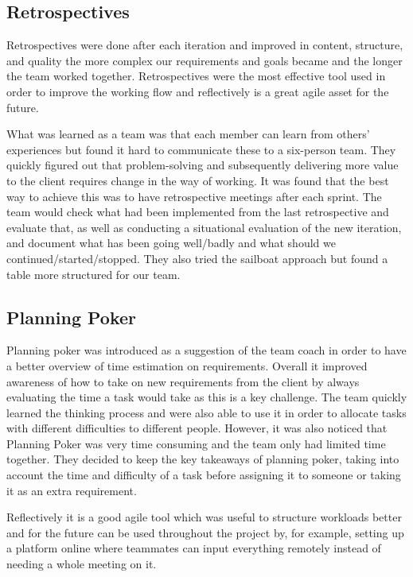 \documentclass{l3proj}
\begin{document}
\subsection{Retrospectives }
Retrospectives were done after each iteration and improved in content, structure, and quality the more complex our requirements and goals became and the longer the team worked together. Retrospectives were the most effective tool used in order to improve the working flow and reflectively is a great agile asset for the future.  

What was learned as a team was that each member can learn from others' experiences but found it hard to communicate these to a six-person team. They quickly figured out that problem-solving and subsequently delivering more value to the client requires change in the way of working. It was found that the best way to achieve this was to have retrospective meetings after each sprint. The team would check what had been implemented from the last retrospective and evaluate that, as well as conducting a situational evaluation of the new iteration, and document what has been going well/badly and what should we continued/started/stopped. They also tried the sailboat approach but found a table more structured for our team.

\subsection{Planning Poker}
Planning poker was introduced as a suggestion of the team coach in order to have a better overview of time estimation on requirements. Overall it improved awareness of how to take on new requirements from the client by always evaluating the time a task would take as this is a key challenge. The team quickly learned the thinking process and were also able to use it in order to allocate tasks with different difficulties to different people. However, it was also noticed that Planning Poker was very time consuming and the team only had limited time together. They decided to keep the key takeaways of planning poker, taking into account the time and difficulty of a task before assigning it to someone or taking it as an extra requirement.

Reflectively it is a good agile tool which was useful to structure workloads better and for the future can be used throughout the project by, for example, setting up a platform online where teammates can input everything remotely instead of needing a whole meeting on it.  
\end{document}
